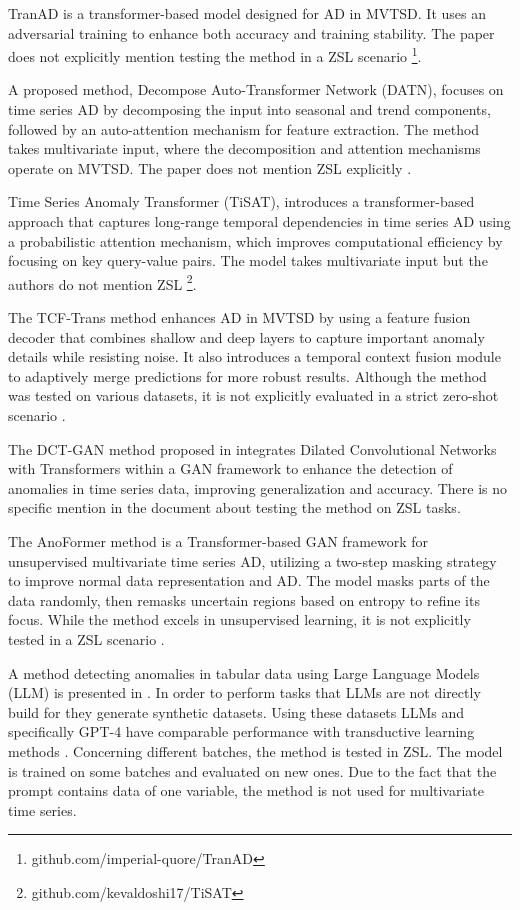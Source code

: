 TranAD is a transformer-based model designed for AD in MVTSD. It uses an adversarial training to enhance both accuracy and training stability. The paper does not explicitly mention testing the method in a ZSL scenario \cite{tuli_tranad_2022} \footnote{\fussy\tiny github.com/imperial-quore/TranAD}.

A proposed method, Decompose Auto-Transformer Network (DATN), focuses on time series AD by decomposing the input into seasonal and trend components, followed by an auto-attention mechanism for feature extraction. The method takes multivariate input, where the decomposition and attention mechanisms operate on MVTSD. The paper does not mention ZSL explicitly \cite{wu_decompose_2023}.

Time Series Anomaly Transformer (TiSAT), introduces a transformer-based approach that captures long-range temporal dependencies in time series AD using a probabilistic attention mechanism, which improves computational efficiency by focusing on key query-value pairs. The model takes multivariate input but the authors do not mention ZSL \cite{doshi_tisat_2022} \footnote{\fussy\tiny github.com/kevaldoshi17/TiSAT}.

The TCF-Trans method enhances AD in MVTSD by using a feature fusion decoder that combines shallow and deep layers to capture important anomaly details while resisting noise. It also introduces a temporal context fusion module to adaptively merge predictions for more robust results. Although the method was tested on various datasets, it is not explicitly evaluated in a strict zero-shot scenario \cite{peng_tcf-trans_2023}.

The DCT-GAN method proposed in \cite{li_dct-gan_2023} integrates Dilated Convolutional Networks with Transformers within a GAN framework to enhance the detection of anomalies in time series data, improving generalization and accuracy. There is no specific mention in the document about testing the method on ZSL tasks.

The AnoFormer method is a Transformer-based GAN framework for unsupervised multivariate time series AD, utilizing a two-step masking strategy to improve normal data representation and AD. The model masks parts of the data randomly, then remasks uncertain regions based on entropy to refine its focus. While the method excels in unsupervised learning, it is not explicitly tested in a ZSL scenario \cite{shin_time_2023}.

A method detecting anomalies in tabular data using Large Language Models (LLM) is presented in \cite{li_anomaly_2024}. In order to perform tasks that LLMs are not directly build for they generate synthetic datasets. Using these datasets LLMs and specifically GPT-4 have comparable performance with transductive learning methods \cite[p. 6]{li_anomaly_2024}. Concerning different batches, the method is tested in ZSL. The model is trained on some batches and evaluated on new ones. Due to the fact that the prompt contains data of one variable, the method is not used for multivariate time series.

